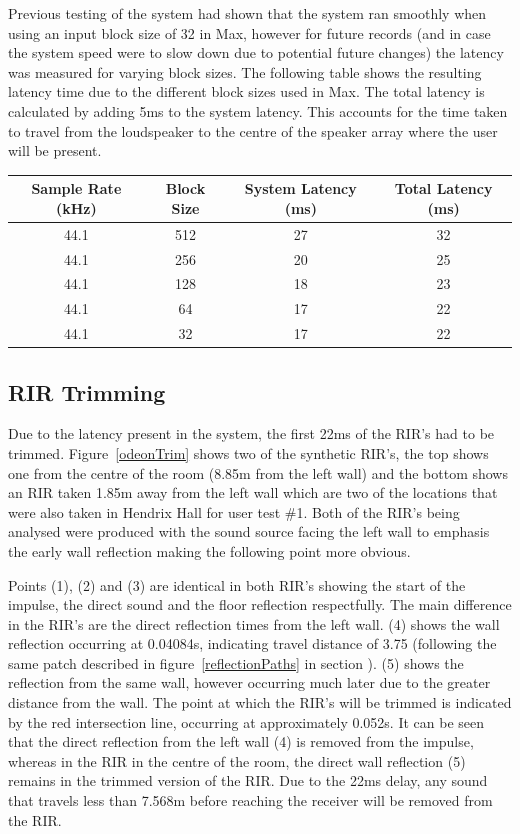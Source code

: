 \documentclass[../../main.tex]{subfiles}
\begin{document}
		Previous testing of the system had shown that the system ran smoothly when using an input block size of 32 in Max, however for future records (and in case the system speed were to slow down due to potential future changes) the latency was measured for varying block sizes. The following table shows the resulting latency time due to the different block sizes used in Max. The total latency is calculated by adding 5ms to the system latency. This accounts for the time taken to travel from the loudspeaker to the centre of the speaker array where the user will be present.


		\begin{center}
		\begin{tabular}{|c |c |c |c|}
		\hline
		Sample Rate (kHz) & Block Size & System Latency (ms) & Total Latency (ms) \\ \hline
		44.1 & 512 & 27 & 32 \\ \hline
		44.1 & 256 & 20 & 25 \\ \hline
		44.1 & 128 & 18 & 23 \\ \hline
		44.1 & 64 & 17 & 22 \\ \hline
		44.1 & 32 & 17 & 22 \\ \hline
		\end{tabular}
		\end{center}


	\subsection{RIR Trimming}
		Due to the latency present in the system, the first 22ms of the \ac{RIR}'s had to be trimmed. Figure~\ref{odeonTrim} shows two of the synthetic \ac{RIR}'s, the top shows one from the centre of the room (8.85m from the left wall) and the bottom shows an \ac{RIR} taken 1.85m away from the left wall which are two of the locations that were also taken in Hendrix Hall for user test \#1. Both of the \ac{RIR}'s being analysed were produced with the sound source facing the left wall to emphasis the early wall reflection making the following point more obvious. 

		Points (1), (2) and (3) are identical in both \ac{RIR}'s showing the start of the impulse, the direct sound and the floor reflection respectfully. The main difference in the \ac{RIR}'s are the direct reflection times from the left wall. (4) shows the wall reflection occurring at 0.04084s, indicating travel distance of 3.75 (following the same patch described in figure~\ref{reflectionPaths} in section ). (5) shows the reflection from the same wall, however occurring much later due to the greater distance from the wall. The point at which the \ac{RIR}'s will be trimmed is indicated by the red intersection line, occurring at approximately 0.052s. It can be seen that the direct reflection from the left wall (4) is removed from the impulse, whereas in the \ac{RIR} in the centre of the room, the direct wall reflection (5) remains in the trimmed version of the \ac{RIR}. Due to the 22ms delay, any sound that travels less than 7.568m before reaching the receiver will be removed from the \ac{RIR}. 
\end{document}
